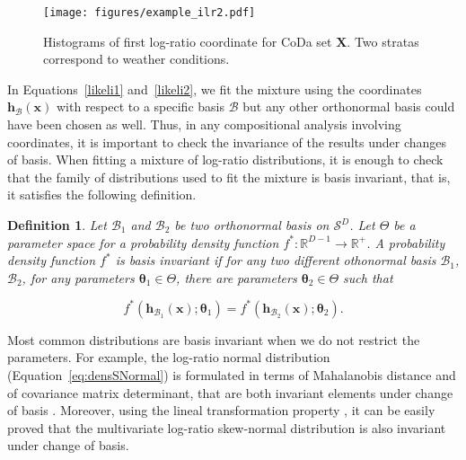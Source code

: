 \documentclass[12pt, a4paper]{article}
\newcommand{\m}[1]{\boldsymbol{#1}}
\newtheorem{definition}{Definition}
\begin{document}
\begin{figure}[thbp]
\centering
\texttt{[image: figures/example\_ilr2.pdf]}
\caption{Histograms of first log-ratio coordinate for CoDa set $\mathbf{X}$. Two stratas correspond to weather conditions.}\label{example_ilr2}
\end{figure}
% 

In Equations~\ref{likeli1} and~\ref{likeli2}, we fit the mixture using the coordinates $\textbf{h}_\mathcal{B}(\textbf{x})$ with respect to a specific basis $\mathcal{B}$ but any other orthonormal basis could have been chosen as well. Thus, in any compositional analysis involving coordinates, it is important to check the invariance of the results under changes of basis. When fitting a mixture of log-ratio distributions, it is enough to check that the family of distributions used to fit the mixture is basis invariant, that is, it satisfies the following definition. 

\begin{definition}
Let $\mathcal{B}_1$ and $\mathcal{B}_2$ be two orthonormal basis on $\mathcal{S}^D$. Let $\Theta$ be a parameter space for a probability density function $f^*: \mathbb{R}^{D-1} \rightarrow \mathbb{R}^+$. 
A probability density function $f^*$ is \emph{basis invariant} if for any two different othonormal basis $\mathcal{B}_1$, $\mathcal{B}_2$, for any parameters $\m\theta_1 \in \Theta$, there are parameters $\m\theta_2 \in \Theta$ such that
\end{definition}
\vspace{-1.25cm}
$$
f^*(\textbf{h}_{\mathcal{B}_1}(\textbf{x}); \m\theta_1) = f^*(\textbf{h}_{\mathcal{B}_2}(\textbf{x}); \m\theta_2).
$$



Most common distributions are basis invariant when we do not restrict the parameters. For example, the log-ratio normal distribution (Equation~\ref{eq:densSNormal}) is formulated in terms of Mahalanobis distance and of covariance matrix determinant, that are both invariant elements under change of basis  \citep{barcelo1999comment}. Moreover,  using the lineal transformation property \citep{azzalini1999statistical}, it can be easily proved that the multivariate log-ratio skew-normal distribution is also invariant under change of basis. 
\end{document}
